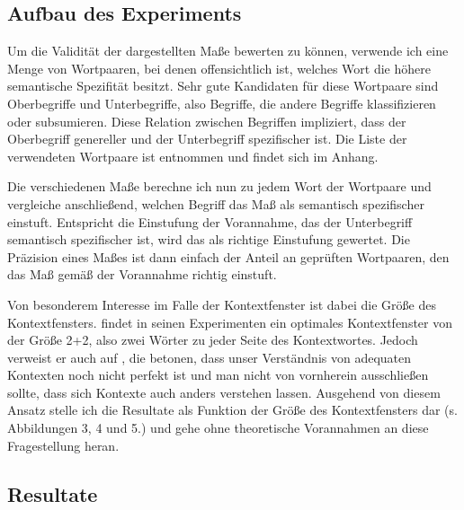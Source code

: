 \documentclass[11pt,numbers=noenddot]{scrartcl}
\begin{document}
\subsection{Aufbau des Experiments} \label{aufbau}

Um die Validität der dargestellten Maße bewerten zu können, verwende ich eine Menge von Wortpaaren, bei denen offensichtlich ist, welches Wort die höhere semantische Spezifität besitzt. Sehr gute Kandidaten für diese Wortpaare sind Oberbegriffe und Unterbegriffe, also Begriffe, die andere Begriffe klassifizieren oder subsumieren. Diese Relation zwischen Begriffen impliziert, dass der Oberbegriff genereller und der Unterbegriff spezifischer ist. Die Liste der verwendeten Wortpaare ist \citet{Caraballo99determiningthe} entnommen und findet sich im Anhang.

Die verschiedenen Maße berechne ich nun zu jedem Wort der Wortpaare und vergleiche anschließend, welchen Begriff das Maß als semantisch spezifischer einstuft. Entspricht die Einstufung der Vorannahme, das der Unterbegriff semantisch spezifischer ist, wird das als richtige Einstufung gewertet. Die Präzision eines Maßes ist dann einfach der Anteil an geprüften Wortpaaren, den das Maß gemäß der Vorannahme richtig einstuft.

Von besonderem Interesse im Falle der Kontextfenster ist dabei die Größe des Kontextfensters. \citet[S. 68]{sahlgren2006word} findet in seinen Experimenten ein optimales Kontextfenster von der Größe 2+2, also zwei Wörter zu jeder Seite des Kontextwortes. Jedoch verweist er auch auf \citet{Miller2000-MILLRF}, die betonen, dass unser Verständnis von adequaten Kontexten noch nicht perfekt ist und man nicht von vornherein ausschließen sollte, dass sich Kontexte auch anders verstehen lassen. Ausgehend von diesem Ansatz stelle ich die Resultate als Funktion der Größe des Kontextfensters dar (s. Abbildungen 3, 4 und 5.) und gehe ohne theoretische Vorannahmen an diese Fragestellung heran.

\subsection{Resultate}
\end{document}

